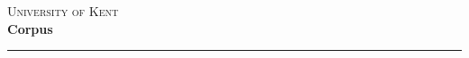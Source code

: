 \begin{titlepage}


\center

\textsc{\LARGE University of Kent}\\[5.5cm]
\textbf{\Large Corpus}
\rule{\linewidth}{0.2mm}\\[0.3cm]
\\[2.0cm]
\\[0.2cm]
\\[0.2cm]


\end{titlepage}